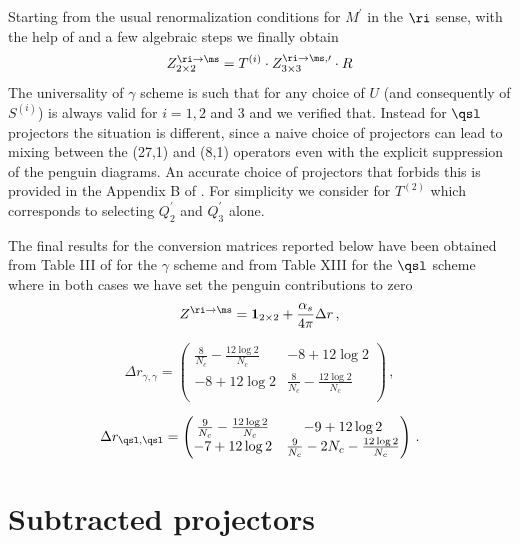 \documentclass[aps,prd,twocolumn,nofootinbib,showpacs,superscriptaddress]{revtex4-1}
\begin{document}
Starting from the usual renormalization conditions for $M^\prime$ 
in the $\ri$ sense, with the help of  and a few algebraic steps
we finally obtain
\begin{equation}
Z^{\ri \to \ms}_{2 \times 2} = T^{(i)} \cdot Z_{3 \times 3}^{\ri \to \ms, \prime} \cdot R  
\label{eq:Zri2ms}
\end{equation}
The universality of $\gamma$ scheme is such that for any choice of $U$ (and consequently of 
$S^{(i)}$)  is always valid for $i=1,2$ and 3 and we verified that.
Instead for $\qsl$ projectors the situation is different, since a naive choice
of projectors can lead to mixing between the (27,1) and (8,1) operators even
with the explicit suppression of the penguin diagrams.
An accurate choice of projectors that forbids this is provided in the Appendix B of 
. For simplicity we consider  for $T^{(2)}$ 
which corresponds to selecting $Q_2^\prime$ and $Q_3^\prime$ alone.

The final results for the conversion matrices reported below have been obtained
from Table III of  for the $\gamma$ scheme and
from Table XIII for the $\qsl$ scheme where in both cases we have 
set the penguin contributions to zero
\begin{equation}
Z^{\ri \to \ms} = \mathbf{1}_{2 \times 2} + \frac{\alpha_s}{4 \pi} \Delta r \,,
\end{equation}

\begin{equation}
\Delta r_{\gamma, \gamma} = \begin{pmatrix}
\frac{8}{N_c} - \frac{12 \log 2}{N_c} & -8 + 12 \log 2 \\
-8 + 12 \log 2 & \frac{8}{N_c} - \frac{12 \log 2}{N_c} \\
\end{pmatrix} \,,
\end{equation}

\begin{equation}
\Delta r_{\qsl, \qsl} = \begin{pmatrix}
\frac{9}{N_c} - \frac{12 \log 2}{N_c} & -9 + 12 \log 2 \\
-7 + 12 \log 2 & \frac{9}{N_c} - 2 N_c -\frac{12 \log 2}{N_c} \\
\end{pmatrix} \,.
\end{equation}

\section{Subtracted projectors}
\label{app:subproj}
\end{document}
